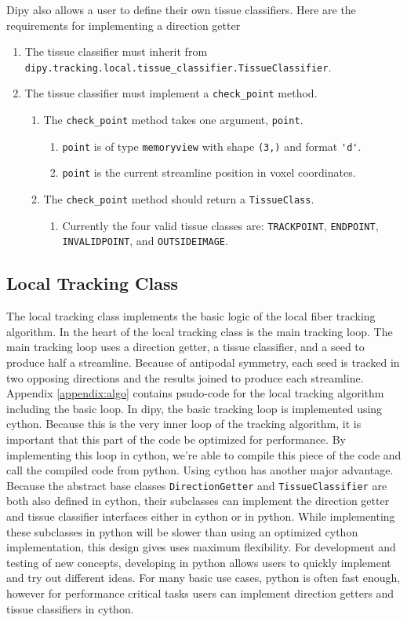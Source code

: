     Dipy also allows a user to define their own tissue classifiers. Here are the requirements for implementing a direction getter
\begin{enumerate}
\item The tissue classifier must inherit from \verb|dipy.tracking.local.tissue_classifier.TissueClassifier|.
\item The tissue classifier must implement a \verb|check_point| method.
\begin{enumerate}
\item The \verb|check_point| method takes one argument, \verb|point|.
\begin{enumerate}
\item \verb|point| is of type \verb|memoryview| with shape \verb|(3,)| and format \verb|'d'|.
\item \verb|point| is the current streamline position in voxel coordinates.
\end{enumerate}
\item The \verb|check_point| method should return a \verb|TissueClass|.
\begin{enumerate}
\item Currently the four valid tissue classes are:  \verb|TRACKPOINT|, \verb|ENDPOINT|, \verb|INVALIDPOINT|, and \verb|OUTSIDEIMAGE|.
\end{enumerate}
\end{enumerate}
\end{enumerate}

\subsection{Local Tracking Class}
    The local tracking class implements the basic logic of the local fiber tracking algorithm. In the heart of the local tracking class is the main tracking loop. The main tracking loop uses a direction getter, a tissue classifier, and a seed to produce half a streamline. Because of antipodal symmetry, each seed is tracked in two opposing directions and the results joined to produce each streamline. Appendix \ref{appendix:algo} contains psudo-code for the local tracking algorithm including the basic loop. In dipy, the basic tracking loop is implemented using cython. Because this is the very inner loop of the tracking algorithm, it is important that this part of the code be optimized for performance. By implementing this loop in cython, we're able to compile this piece of the code and call the compiled code from python. Using cython has another major advantage. Because the abstract base classes \verb|DirectionGetter| and \verb|TissueClassifier| are both also defined in cython, their subclasses can implement the direction getter and tissue classifier interfaces either in cython or in python. While implementing these subclasses in python will be slower than using an optimized cython implementation, this design gives uses maximum flexibility. For development and testing of new concepts, developing in python allows users to quickly implement and try out different ideas. For many basic use cases, python is often fast enough, however for performance critical tasks users can implement direction getters and tissue classifiers in cython.